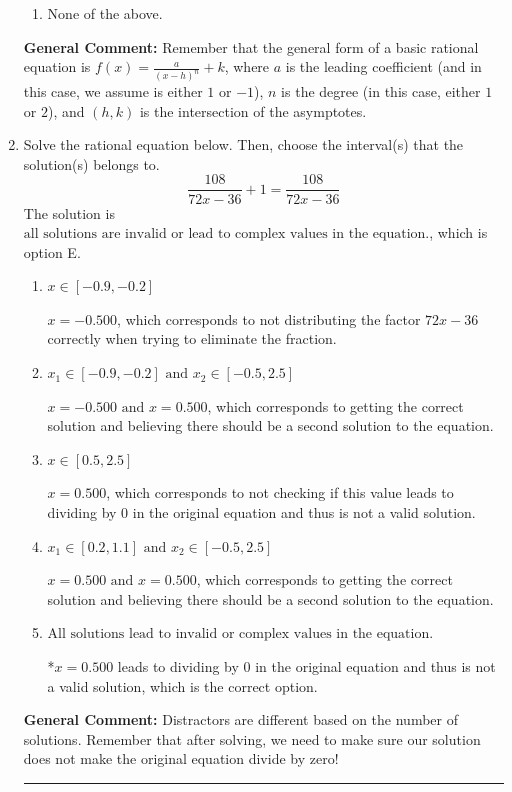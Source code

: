\documentclass{extbook}[14pt]
\newcommand{\litem}[1]{\item #1

\rule{\textwidth}{0.4pt}}
\begin{document}
\begin{enumerate}
{\begin{enumerate}[label=\Alph*.]
\begin{multicols}{2}
\end{multicols}\item None of the above.\end{enumerate}
\textbf{General Comment:} Remember that the general form of a basic rational equation is $ f(x) = \frac{a}{(x-h)^n} + k$, where $a$ is the leading coefficient (and in this case, we assume is either $1$ or $-1$), $n$ is the degree (in this case, either $1$ or $2$), and $(h, k)$ is the intersection of the asymptotes.
}
\litem{
Solve the rational equation below. Then, choose the interval(s) that the solution(s) belongs to.
\[ \frac{108}{72x -36} + 1 = \frac{108}{72x -36} \]The solution is \( \text{all solutions are invalid or lead to complex values in the equation.} \), which is option E.\begin{enumerate}[label=\Alph*.]
\item \( x \in [-0.9,-0.2] \)

$x = -0.500$, which corresponds to not distributing the factor $72x -36$ correctly when trying to eliminate the fraction.
\item \( x_1 \in [-0.9, -0.2] \text{ and } x_2 \in [-0.5,2.5] \)

$x = -0.500 \text{ and } x = 0.500$, which corresponds to getting the correct solution and believing there should be a second solution to the equation.
\item \( x \in [0.5,2.5] \)

$x = 0.500$, which corresponds to not checking if this value leads to dividing by 0 in the original equation and thus is not a valid solution.
\item \( x_1 \in [0.2, 1.1] \text{ and } x_2 \in [-0.5,2.5] \)

$x = 0.500 \text{ and } x = 0.500$, which corresponds to getting the correct solution and believing there should be a second solution to the equation.
\item \( \text{All solutions lead to invalid or complex values in the equation.} \)

*$x = 0.500$ leads to dividing by 0 in the original equation and thus is not a valid solution, which is the correct option.
\end{enumerate}

\textbf{General Comment:} Distractors are different based on the number of solutions. Remember that after solving, we need to make sure our solution does not make the original equation divide by zero!
}
\end{enumerate}
\end{document}
